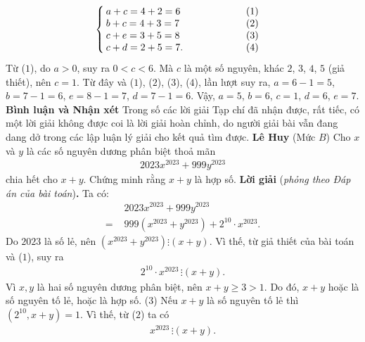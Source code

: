 \begin{multicols}{2}
\begin{align*}
\begin{cases}
			a + c = 4 + 2 = 6 \hspace*{67pt} (1)\\[-0.5ex]
			b + c = 4 + 3 = 7 \hfill (2)\\[-0.5ex]
			c + e = 3 + 5 = 8 \hfill (3)\\[-0.5ex]
			c + d = 2 + 5 = 7. \hfill (4)
		\end{cases}
	\end{align*}
	Từ ($1$), do $a > 0$, suy ra $0 < c < 6$. Mà $c$ là một số nguyên, khác $2$, $3$, $4$, $5$ (giả thiết), nên $c = 1$. Từ đây và ($1$), ($2$), ($3$), ($4$), lần lượt suy ra, $a = 6 - 1 = 5$, $b = 7 - 1 = 6$, $e = 8 - 1 = 7$, $d = 7 - 1 = 6$.
	\vskip 0.05cm
	Vậy, $a = 5$, $b = 6$, $c = 1$, $d = 6$, $e = 7$.
	\vskip 0.05cm
	\textbf{\color{thachthuctoanhoc}Bình luận và Nhận xét}
	\vskip 0.05cm
	Trong số các lời giải Tạp chí đã nhận được, rất tiếc, có một lời giải không được coi là lời giải hoàn chỉnh, do người giải bài vẫn đang dang dở trong các lập luận lý giải cho kết quả tìm được.
	\vskip 0.05cm
	\hfill\textbf{\color{thachthuctoanhoc}Lê Huy}
	\vskip 0.05cm
	{}
	(Mức $B$) Cho $x$ và $y$ là các số nguyên dương phân biệt thoả mãn
	\begin{align*}
		2023x^{2023}+999 y^{2023}
	\end{align*}
	chia hết cho $x+y$. Chứng minh rằng $x+y$ là hợp số. 
	\vskip 0.05cm
	\textbf{\color{thachthuctoanhoc}Lời giải} (\textit{phỏng theo Đáp án của bài toán})\textbf{\color{thachthuctoanhoc}.}
	\vskip 0.05cm
	Ta có:
	\begin{align*}
		&2023{x^{2023}} + 999{y^{2023}} \\[-0.5ex]
		= \,\,&999\left( {{x^{2023}} + {y^{2023}}} \right) + {2^{10}} \cdot {x^{2023}}.\tag{$1$}
	\end{align*}
	Do $2023$ là số lẻ, nên $\left( {{x^{2023}} + {y^{2023}}} \right) \vdots \left( {x + y} \right)$. Vì thế, từ giả thiết của bài toán và ($1$), suy ra
	\begin{align*}
		{2^{10}} \cdot {x^{2023}} \,\vdots \left( {x + y} \right).\tag{$2$}
	\end{align*}
	Vì $x, y$ là hai số nguyên dương phân biệt, nên $x + y \ge  3 > 1$. Do đó, $x + y$ hoặc là số nguyên tố lẻ, hoặc là hợp số.  
	\hfill ($3$)
	\vskip 0.05cm
	Nếu $x + y$ là số nguyên tố lẻ thì $\left( {{2^{10}},x + y} \right) = 1$.  Vì thế, từ ($2$) ta có
	\begin{align*}
		{x^{2023}} \,\vdots \left( {x + y} \right).
	\end{align*}

\end{multicols}
